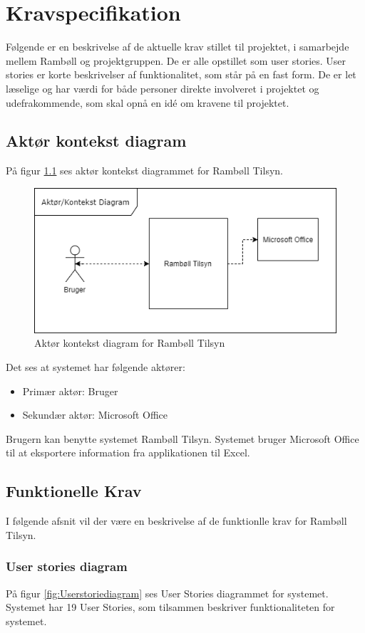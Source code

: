 \chapter{Kravspecifikation}

Følgende er en beskrivelse af de aktuelle krav stillet til projektet, i samarbejde mellem Rambøll og projektgruppen. De er alle opstillet som user stories. User stories er korte beskrivelser af funktionalitet, som står på en fast form. De er let læselige og har værdi for både personer direkte involveret i projektet og udefrakommende, som skal opnå en idé om kravene til projektet. 

\section{Aktør kontekst diagram}\label{sec:Aktor}
	På figur \ref{fig:AktorKontekst} ses aktør kontekst diagrammet for Rambøll Tilsyn. 
\begin{figure}[H]
	\centering
	\includegraphics[width=0.6\linewidth]{FunktionelleKrav/AktorDiagram}
	\caption{Aktør kontekst diagram for Rambøll Tilsyn}
	\label{fig:AktorKontekst}
\end{figure}
Det ses at systemet har følgende aktører:
\begin{itemize}
	\item Primær aktør: Bruger
	\item Sekundær aktør: Microsoft Office \\
\end{itemize}

Brugern kan benytte systemet Rambøll Tilsyn. Systemet bruger Microsoft Office til at eksportere information fra applikationen til Excel.

\clearpage

\section{Funktionelle Krav} \label{sec:UserStories}
I følgende afsnit vil der være en beskrivelse af de funktionlle krav for Rambøll Tilsyn.

\subsection{User stories diagram}
På figur \ref{fig:Userstoriediagram} ses User Stories diagrammet for systemet. Systemet har 19 User Stories, som tilsammen beskriver funktionaliteten for systemet. \\

